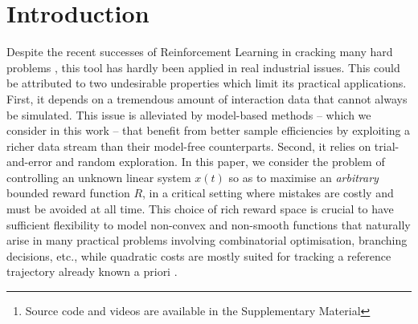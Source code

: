 \documentclass{article}
\begin{document}
\begin{abstract}
We develop a framework for the adaptive model predictive control of a linear system with unknown parameters and arbitrary bounded costs, in a critical setting where failures are costly and should be prevented at all time.  Our approach builds on two ideas: first, we incorporate prior knowledge of the dynamics in the form of a known structure that shapes uncertainty, which can be tightened as we collect interaction data by building high-confidence regions through least-square regression. Second, in order to handle this uncertainty we formulate a robust control objective. Leveraging tools from the interval prediction literature, we convert the confidence regions on parameters into confidence sets on trajectories induced by the controls. These controls are then optimised resorting to tree-based planning methods. We eventually relax our modeling assumptions with a multi-model extension based on a data-driven robust model selection mechanism. The full procedure is designed to produce reasonable and safe behaviours at deployment while recovering an asymptotic optimality. We illustrate it on a practical case of autonomous driving at a crossroads intersection among vehicles with uncertain behaviours.\footnote[2]{Source code and videos are available in the Supplementary Material}
\end{abstract}	

\section{Introduction}

Despite the recent successes of Reinforcement Learning in cracking many hard problems \citep[e.g.][]{mnih2015humanlevel,Silver1140}, this tool has hardly been applied in real industrial issues. This could be attributed to two undesirable properties which limit its practical applications. First, it depends on a tremendous amount of interaction data that cannot always be simulated. This issue is alleviated by model-based methods -- which we consider in this work -- that benefit from better sample efficiencies by exploiting a richer data stream than their model-free counterparts. Second, it relies on trial-and-error and random exploration. In this paper, we consider the problem of controlling an unknown linear system $x(t)$ so as to maximise an \emph{arbitrary} bounded reward function $R$, in a critical setting where mistakes are costly and must be avoided at all time. 
This choice of rich reward space is crucial to have sufficient flexibility to model non-convex and non-smooth functions that naturally arise in many practical problems involving combinatorial optimisation, branching decisions, etc., while quadratic costs are mostly suited for tracking a reference trajectory already known a priori \citep[e.g.][]{Kumar2013}.
\end{document}
